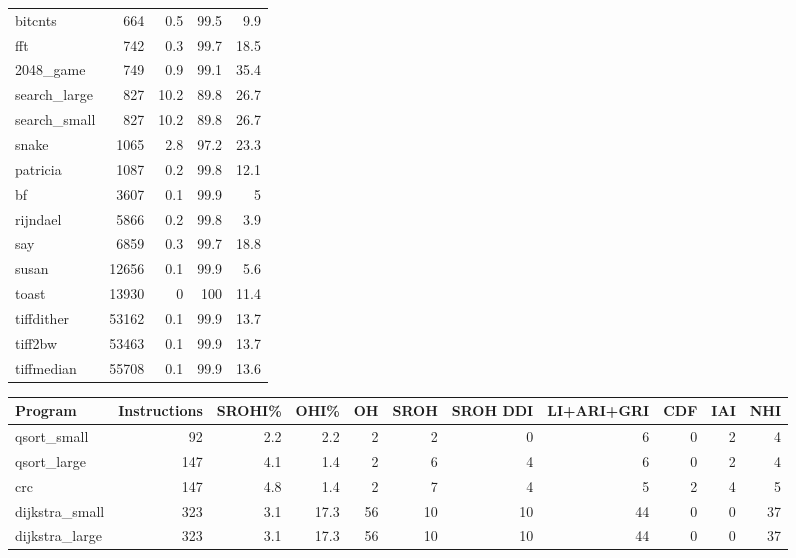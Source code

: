 \begin{tabular}{lrrrr}
 bitcnts         &     664 &    0.5 &         99.5 &     9.9 \\
 fft             &     742 &    0.3 &         99.7 &    18.5 \\
 2048\_game       &     749 &    0.9 &         99.1 &    35.4 \\
 search\_large    &     827 &   10.2 &         89.8 &    26.7 \\
 search\_small    &     827 &   10.2 &         89.8 &    26.7 \\
 snake           &    1065 &    2.8 &         97.2 &    23.3 \\
 patricia        &    1087 &    0.2 &         99.8 &    12.1 \\
 bf              &    3607 &    0.1 &         99.9 &     5   \\
 rijndael        &    5866 &    0.2 &         99.8 &     3.9 \\
 say             &    6859 &    0.3 &         99.7 &    18.8 \\
 susan           &   12656 &    0.1 &         99.9 &     5.6 \\
 toast           &   13930 &    0   &        100   &    11.4 \\
 tiffdither      &   53162 &    0.1 &         99.9 &    13.7 \\
 tiff2bw         &   53463 &    0.1 &         99.9 &    13.7 \\
 tiffmedian      &   55708 &    0.1 &         99.9 &    13.6 \\
\hline
\end{tabular}\begin{tabular}{lrrrrrrrrrr}
\hline
 Program         &   Instructions &   SROHI\% &   OHI\% &   OH &   SROH &   SROH DDI &   LI+ARI+GRI &   CDF &   IAI &   NHI \\
\hline
 qsort\_small     &             92 &      2.2 &    2.2 &    2 &      2 &          0 &            6 &     0 &     2 &     4 \\
 qsort\_large     &            147 &      4.1 &    1.4 &    2 &      6 &          4 &            6 &     0 &     2 &     4 \\
 crc             &            147 &      4.8 &    1.4 &    2 &      7 &          4 &            5 &     2 &     4 &     5 \\
 dijkstra\_small  &            323 &      3.1 &   17.3 &   56 &     10 &         10 &           44 &     0 &     0 &    37 \\
 dijkstra\_large  &            323 &      3.1 &   17.3 &   56 &     10 &         10 &           44 &     0 &     0 &    37 \\

\end{tabular}

